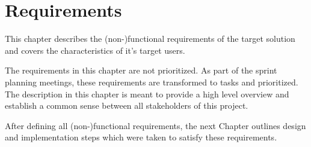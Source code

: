 
\chapter{Requirements}
\label{cha:requirements}


This chapter describes the (non-)functional requirements of the target solution and covers the characteristics of it's target users. 

The requirements in this chapter are not prioritized. As part of the sprint planning meetings, these requirements are transformed to tasks and prioritized. The description in this chapter is meant to provide a high level overview and establish a common sense between all stakeholders of this project.







\bigskip

After defining all (non-)functional requirements, the next Chapter outlines design and implementation steps which were taken to satisfy these requirements.

